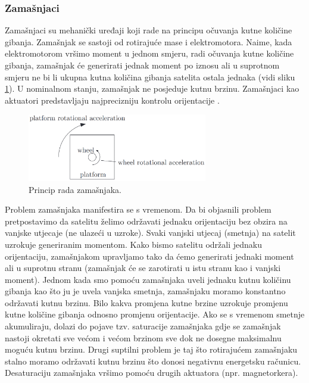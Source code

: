\documentclass[times, utf8, diplomski, numeric]{templates/template}
\begin{document}
{{{            \subsubsection{Zamašnjaci }{
                Zamašnjaci su mehanički uređaji koji rade na principu očuvanja kutne količine gibanja. Zamašnjak se sastoji od rotirajuće mase i elektromotora. Naime, kada elektromotorom vršimo moment u jednom smjeru, radi očuvanja kutne količine gibanja, zamašnjak će generirati jednak moment po iznosu ali u suprotnom smjeru ne bi li ukupna kutna količina gibanja satelita ostala jednaka (vidi sliku \ref{fig:zamasnjak_fig}). U nominalnom stanju, zamašnjak ne posjeduje kutnu brzinu. Zamašnjaci kao aktuatori predstavljaju najprecizniju kontrolu orijentacije \cite{adcsKnjiga}.

                \begin{figure}[htb]
                \centering
                \includegraphics[width=0.7\textwidth]{images/zamasnjak.png}
                \caption{Princip rada zamašnjaka.}
                \label{fig:zamasnjak_fig}
                \end{figure}

                Problem zamašnjaka manifestira se s vremenom. Da bi objasnili problem pretpostavimo da satelitu želimo održavati jednaku orijentaciju bez obzira na vanjske utjecaje (ne ulazeći u uzroke). Svaki vanjski utjecaj (smetnja) na satelit uzrokuje generiranim momentom. Kako bismo satelitu održali jednaku orijentaciju, zamašnjakom upravljamo tako da ćemo generirati jednaki moment ali u suprotnu stranu (zamašnjak će se zarotirati u istu stranu kao i vanjski moment). Jednom kada smo pomoću zamašnjaka uveli jednaku kutnu količinu gibanja kao što ju je uvela vanjska smetnja, zamašnjaku moramo konstantno održavati kutnu brzinu. Bilo kakva promjena kutne brzine uzrokuje promjenu kutne količine gibanja odnosno promjenu orijentacije. Ako se s vremenom smetnje akumuliraju, dolazi do pojave tzv. saturacije zamašnjaka gdje se zamašnjak nastoji okretati sve većom i većom brzinom sve dok ne dosegne maksimalnu moguću kutnu brzinu. Drugi suptilni problem je taj što rotirajućem zamašnjaku stalno moramo održavati kutnu brzinu što donosi negativnu energetsku računicu. Desaturaciju zamašnjaka vršimo pomoću drugih aktuatora (npr. magnetorkera).

}}}}
\end{document}
